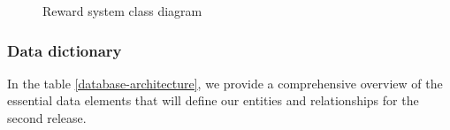 \begin{figure}[H]
    \centering
    \caption{Reward system class diagram}
    \label{fig:reward_system-class}
\end{figure}

\subsubsection{Data dictionary}
In the table \ref{database-architecture}, we provide a comprehensive overview of the essential data elements
that will define our entities and relationships for the second release.



